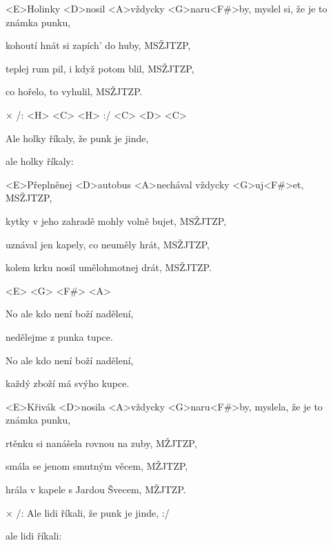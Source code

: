 

\zs
<E>Holinky <D>nosil <A>vždycky <G>naru<F#>by, myslel si, že je to známka punku,

kohoutí hnát si zapích' do huby, MSŽJTZP,

teplej rum pil, i když potom blil, MSŽJTZP,

co hořelo, to vyhulil, MSŽJTZP.
\ks

× /: <H> <C> <H> :/ <C> <D> <C>

Ale holky říkaly,
že punk je jinde,

ale holky říkaly:
\kr

\zs
<E>Přeplněnej <D>autobus <A>nechával vždycky <G>uj<F#>et, MSŽJTZP,

kytky v jeho zahradě mohly volně bujet, MSŽJTZP,

uznával jen kapely, co neuměly hrát, MSŽJTZP,

kolem krku nosil umělohmotnej drát, MSŽJTZP.
\ks

\zr \kr

\zs
<E> <G> <F#> <A>

No ale kdo není boží nadělení,

nedělejme z punka tupce.

No ale kdo není boží nadělení,

každý zboží má svýho kupce.
\ks

\zs
<E>Křivák <D>nosila <A>vždycky <G>naru<F#>by,
myslela, že je to známka punku,

rtěnku si nanášela rovnou na zuby, MŽJTZP,

smála se jenom smutným věcem, MŽJTZP,

hrála v kapele s Jardou Švecem, MŽJTZP.
\ks

× /: Ale lidi říkali,
že punk je jinde, :/

ale lidi říkali:
\kr

\kp
